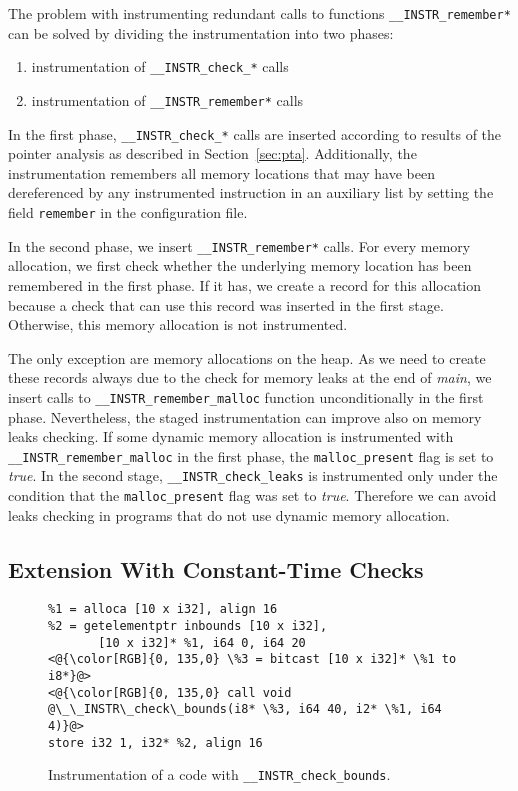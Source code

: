 The problem with instrumenting redundant calls to functions
\texttt{\_\_INSTR\_remember*} can be solved by dividing the instrumentation
into two phases:
\begin{enumerate}
  \item instrumentation of \texttt{\_\_INSTR\_check\_*} calls
  \item instrumentation of \texttt{\_\_INSTR\_remember*} calls
\end{enumerate}

In the first phase, \texttt{\_\_INSTR\_check\_*} calls are inserted
according to results of the pointer analysis as described in
Section~\ref{sec:pta}. Additionally, the instrumentation remembers all memory
locations that may have been dereferenced by any instrumented instruction in an
auxiliary list by setting the field \texttt{remember} in the configuration file.

In the second phase, we insert \texttt{\_\_INSTR\_remember*} calls. For every
memory allocation, we first check whether the underlying memory location has
been remembered in the first phase.  If it has, we
create a record for this allocation because a check that can use this record
was inserted in the first stage. Otherwise, this memory allocation is not
instrumented.

The only exception are memory allocations on the heap. As we need to
create these records always due to the check for memory leaks at the
end of \emph{main}, we insert calls to
\texttt{\_\_INSTR\_remember\_malloc} function unconditionally in the
first phase.  Nevertheless, the staged instrumentation can improve
also on memory leaks checking. If some dynamic memory allocation is
instrumented with \texttt{\_\_INSTR\_remember\_malloc} in the first
phase, the \texttt{malloc\_present} flag is set to \emph{true}.  In
the second stage, \texttt{\_\_INSTR\_check\_leaks} is instrumented
only under the condition that the \texttt{malloc\_present} flag was
set to \emph{true}. Therefore we can avoid leaks checking in programs
that do not use dynamic memory allocation.

\subsection{Extension With Constant-Time Checks}\label{sec:constant_time}

\begin{figure}[t]
\begin{lstlisting}
%1 = alloca [10 x i32], align 16
%2 = getelementptr inbounds [10 x i32],
       [10 x i32]* %1, i64 0, i64 20
<@{\color[RGB]{0, 135,0} \%3 = bitcast [10 x i32]* \%1 to i8*}@>
<@{\color[RGB]{0, 135,0} call void @\_\_INSTR\_check\_bounds(i8* \%3, i64 40, i2* \%1, i64 4)}@>
store i32 1, i32* %2, align 16
\end{lstlisting}
\caption{Instrumentation of a code with \texttt{\_\_INSTR\_check\_bounds}.}
\label{fig:check_bounds_example}
\end{figure}

